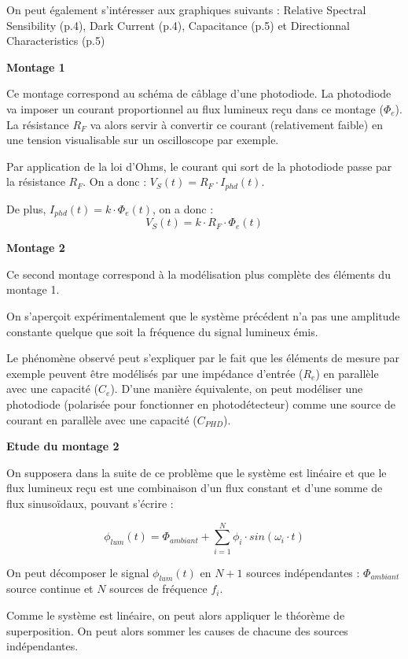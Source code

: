 \documentclass[a4paper,french]{paper}
\begin{document}
On peut également s'intéresser aux graphiques suivants : Relative Spectral Sensibility (p.4), Dark Current (p.4), Capacitance (p.5) et Directionnal Characteristics (p.5)

\qquad

\textbf{Montage 1}

Ce montage correspond au schéma de câblage d'une photodiode. La photodiode va imposer un courant proportionnel au flux lumineux reçu dans ce montage ($\Phi_e$). La résistance $R_F$ va alors servir à convertir ce courant (relativement faible) en une tension visualisable sur un oscilloscope par exemple.

Par application de la loi d'Ohms, le courant qui sort de la photodiode passe par la résistance $R_F$. On a donc : $V_S(t) = R_F \cdot I_{phd}(t)$.

De plus, $I_{phd}(t) = k \cdot \Phi_e(t)$, on a donc : $$\boxed{V_S(t) = k \cdot R_F \cdot \Phi_e(t)}$$

\qquad

\textbf{Montage 2}

Ce second montage correspond à la modélisation plus complète des éléments du montage 1.

On s'aperçoit expérimentalement que le système précédent n'a pas une amplitude constante quelque que soit la fréquence du signal lumineux émis.

Le phénomène observé peut s'expliquer par le fait que les éléments de mesure par exemple peuvent être modélisés par une impédance d'entrée ($R_e$) en parallèle avec une capacité ($C_e$).
D'une manière équivalente, on peut modéliser une photodiode (polarisée pour fonctionner en photodétecteur) comme une source de courant en parallèle avec une capacité ($C_{PHD}$).

\textbf{Etude du montage 2}

On supposera dans la suite de ce problème que le système est linéaire et que le flux lumineux reçu est une combinaison d'un flux constant et d'une somme de flux sinusoïdaux, pouvant s'écrire :

$$\phi_{lum}(t) = \Phi_{ambiant} + \sum_{i = 1}^{N} \phi_i \cdot sin(\omega_i \cdot t)$$

On peut décomposer le signal $\phi_{lum}(t)$ en $N+1$ sources indépendantes : $\Phi_{ambiant}$ source continue et $N$ sources de fréquence $f_i$. 
		
		Comme le système est linéaire, on peut alors appliquer le théorème de superposition. On peut alors sommer les causes de chacune des sources indépendantes.
		
\end{document}
